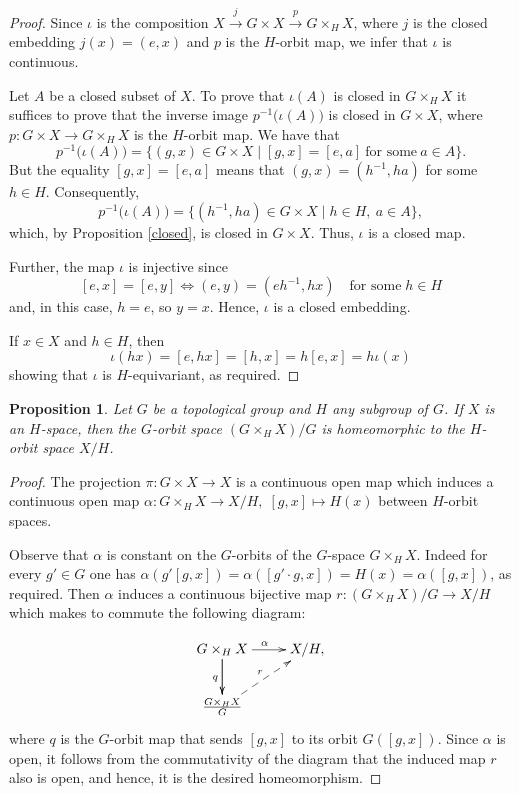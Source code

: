 \documentclass{amsart}
\newtheorem{proposition}[theorem]{Proposition}
\begin{document}
 \begin{proof}
  Since  $\iota$ is the composition $X \stackrel{j}{\rightarrow} G \times X
 \stackrel{p}{\rightarrow} G \times_H X$, where $j$ is the closed embedding $j(x)=(e,x)$ and $p$ is 
 the $H$-orbit map, we infer that $\iota$ is continuous.
 
 Let $A$ be a closed subset of $X$. To prove that $\iota (A)$ is closed in $G \times_H X$ it suffices to prove that the inverse image $p^{-1}\big
 (\iota(A)\big)$ is closed in $G\times X$, where $p:G\times X\to G\times_HX$ is the $H$-orbit map. We have that
 $$p^{-1}\big(\iota(A)\big)=\{(g, x)\in G\times X \mid [g, x]=[e, a] \ \text{for some} \ a\in A\}.$$
 But the equality $[g, x]=[e, a]$ means that $(g, x)=(h^{-1}, ha)$ for some $h\in H$. Consequently, 
  $$p^{-1}\big(\iota(A)\big)=\{(h^{-1}, ha)\in G\times X  \mid h\in H, \ a\in A\},$$
  which, by Proposition \ref{closed}, is closed in $G\times X$. Thus, $\iota$ is a closed map.
  
  Further, the map  $\iota$ is injective since
 \[ [e,x]=[e,y] \Longleftrightarrow (e,y)=(eh^{-1},hx) \quad \text{for some} \; h \in H \]
 and, in this case, $h=e$, so $y=x$. Hence, $\iota$ is a closed embedding.

 If $x \in X$ and $h \in H$, then 
 \[ \iota(hx) = [e, hx] = [h, x] = h[e,x] = h\iota(x)   \]
 showing that  $\iota$ is $H$-equivariant, as required.  
 \end{proof}
 


 \begin{proposition}\label{homeo}
 Let $G$ be a topological group and $H$ any subgroup of  $G$. If $X$ is an $H$-space, then 
 the $G$-orbit space $({G \times_H X})/G$ is homeomorphic to the $H$-orbit space $X/H$.
 \end{proposition}
 \begin{proof}
 The projection  $\pi: G \times X \to X$ is a continuous open map which induces a continuous open map 
  $\alpha:G \times_H X \to X/H, \; [g,x] \mapsto H(x)$ between $H$-orbit spaces.
               
Observe  that $\alpha$ is constant on the $G$-orbits of the $G$-space   $G \times_H X$. Indeed 
for every  $g' \in G$ one has  $\alpha(g'[g,x])=\alpha([g'\cdot g,x])=H(x)=\alpha([g,x])$, as required. Then $\alpha$ induces a continuous  bijective map
 $r:({G \times_H X})/G \to X/H$ which makes to commute the following diagram: 

            
              \[  \xymatrix{%
              G \times_H X \ar[r]^\alpha \ar[d] \ar[d]_q & X/H, \\
              \frac{G \times_H X}{G}  \ar@{-->}[ur]^r  &
              }   \] 
    where $q$ is the $G$-orbit map that sends $[g, x]$ to its orbit $G([g, x])$.     Since $\alpha$ is open, it follows from the commutativity of the diagram that  the induced map $r$ also is open, and hence, it is the desired homeomorphism.     
              
    \end{proof}
\end{document}

